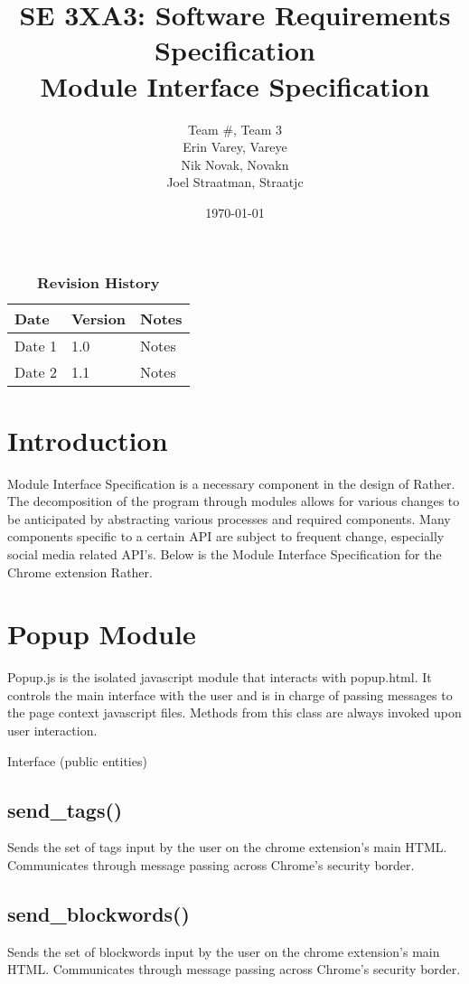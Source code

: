 \documentclass[12pt, titlepage]{article}
\title{SE 3XA3: Software Requirements Specification\\Module Interface Specification}
\author{Team \#, Team 3
		\\ Erin Varey, Vareye
		\\ Nik Novak, Novakn
		\\ Joel Straatman, Straatjc
}
\date{\today}
\begin{document}
\maketitle
{}
\tableofcontents
\listoftables
\begin{table}[bp]
\caption{\bf Revision History}
\begin{tabularx}{\textwidth}{p{3cm}p{2cm}X}
\toprule {\bf Date} & {\bf Version} & {\bf Notes}\\
\midrule
Date 1 & 1.0 & Notes\\
Date 2 & 1.1 & Notes\\
\bottomrule
\end{tabularx}
\end{table}
\newpage
{}
\section{Introduction}
Module Interface Specification is a necessary component in the design of Rather. The decomposition of the program through modules allows for various changes to be anticipated by abstracting various processes and required components. Many components specific to a certain API are subject to frequent change, especially social media related API's. Below is the Module Interface Specification for the Chrome extension Rather.

\section{Popup Module}
Popup.js is the isolated javascript module that interacts with popup.html. It controls the main interface with the user and is in charge of passing messages to the page context javascript files. Methods from this class are always invoked upon user interaction.

Interface (public entities)
\subsection{send\_tags()}
Sends the set of tags input by the user on the chrome extension’s main HTML. Communicates through message passing across Chrome’s security border. 
\subsection{send\_blockwords()}
Sends the set of blockwords input by the user on the chrome extension’s main HTML. Communicates through message passing across Chrome’s security border.
\end{document}
